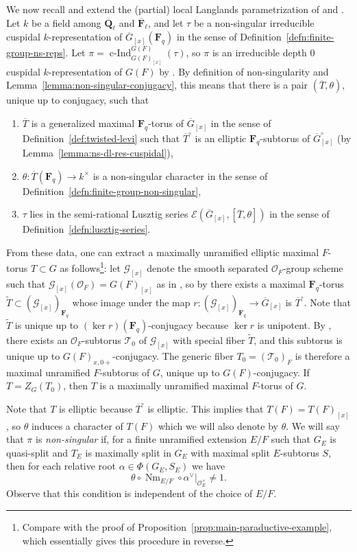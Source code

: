 \documentclass[reqno]{amsart}
\numberwithin{equation}{subsection}
\newcommand{\F}{\mathbf{F}}
\newcommand{\wt}[1]{\widetilde{#1}}
\newcommand{\Q}{\mathbf{Q}}
\newcommand{\ol}[1]{\overline{#1}}
\newcommand{\co}{\colon}
\newcommand\cE{\mathcal{E}}
\newcommand\cG{\mathcal{G}}
\newcommand\cO{\mathcal{O}}
\newcommand\cT{\mathcal{T}}
\DeclareMathOperator{\Nm}{Nm}
\DeclareMathOperator{\cInd}{c-Ind}
\theoremstyle{remark}
\numberwithin{equation}{subsection}
\numberwithin{figure}{subsection}
\begin{document}
We now recall and extend the (partial) local Langlands parametrization of \cite{DR09} and \cite{Kal21b}. Let $k$ be a field among $\ol\Q_\ell$ and $\ol\F_\ell$, and let $\tau$ be a non-singular irreducible cuspidal $k$-representation of $\ol G_{[x]}(\F_q)$ in the sense of Definition~\ref{defn:finite-group-ns-reps}. Let $\pi = \cInd_{G(F)_{[x]}}^{G(F)}(\tau)$, so $\pi$ is an irreducible depth $0$ cuspidal $k$-representation of $G(F)$ by \cite[\S 7]{Vig01b}. By definition of non-singularity and Lemma~\ref{lemma:non-singular-conjugacy}, this means that there is a pair $(\ol T, \theta)$, unique up to conjugacy, such that
\begin{enumerate}
    \item $\ol T$ is a generalized maximal $\F_q$-torus of $\ol G_{[x]}$ in the sense of Definition~\ref{def:twisted-levi} such that $\ol T^\circ$ is an elliptic $\F_q$-subtorus of $\ol G_{[x]}^\circ$ (by Lemma~\ref{lemma:ns-dl-res-cuspidal}),
    \item $\theta\co \ol T(\F_q) \to k^\times$ is a non-singular character in the sense of Definition~\ref{defn:finite-group-non-singular},
    \item $\tau$ lies in the semi-rational Lusztig series $\cE(\ol G_{[x]}, [\ol T, \theta])$ in the sense of Definition~\ref{defn:lusztig-series}.
\end{enumerate}
From these data, one can extract a maximally unramified elliptic maximal $F$-torus $T \subset G$ as follows\footnote{Compare with the proof of Proposition~\ref{prop:main-paraductive-example}, which essentially gives this procedure in reverse.}: let $\cG_{[x]}$ denote the smooth separated $\cO_F$-group scheme such that $\cG_{[x]}(\cO_F) = G(F)_{[x]}$ as in \cite[Remark 8.3.4]{KP}, so by \cite[Proposition~11.14(1)]{Bor91} there exists a maximal $\F_q$-torus $\wt T \subset (\cG_{[x]})_{\F_q}$ whose image under the map $r\co (\cG_{[x]})_{\F_q} \to \ol G_{[x]}$ is $\ol T^\circ$. Note that $\wt T$ is unique up to $(\ker r)(\F_q)$-conjugacy because $\ker r$ is unipotent. By \cite[Expos\'e IX, Th\'eor\`eme 3.6, Th\'eor\`eme 7.1]{SGA3II}, there exists an $\cO_F$-subtorus $\cT_0$ of $\cG_{[x]}$ with special fiber $\wt T$, and this subtorus is unique up to $G(F)_{x,0+}$-conjugacy. The generic fiber $T_0 = (\cT_0)_F$ is therefore a maximal unramified $F$-subtorus of $G$, unique up to $G(F)$-conjugacy. If $T = Z_G(T_0)$, then $T$ is a maximally unramified maximal $F$-torus of $G$.

Note that $T$ is elliptic because $\ol T^\circ$ is elliptic. This implies that $T(F) = T(F)_{[x]}$, so $\theta$ induces a character of $T(F)$ which we will also denote by $\theta$. We will say that $\pi$ is \emph{non-singular} if, for a finite unramified extension $E/F$ such that $G_E$ is quasi-split and $T_E$ is maximally split in $G_E$ with maximal split $E$-subtorus $S$, then for each relative root $\alpha \in \Phi(G_E, S_E)$ we have
\begin{equation}\label{eqn:non-singularity-defn}
    \theta \circ \Nm_{E/F} \circ \alpha^\vee|_{\cO_E^\times} \neq 1.
\end{equation}
Observe that this condition is independent of the choice of $E/F$.
\end{document}
